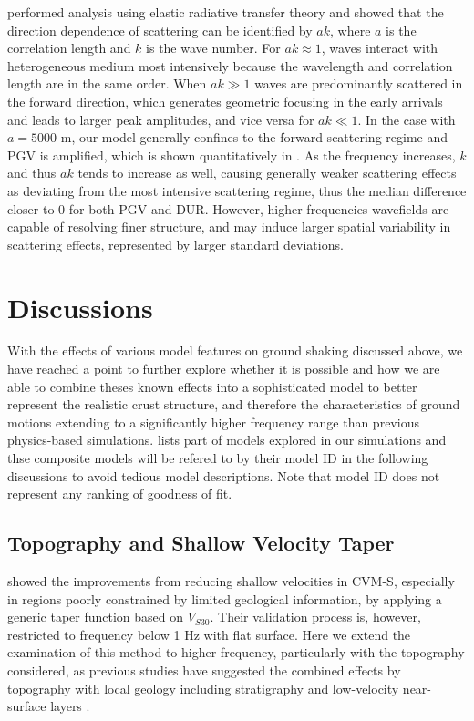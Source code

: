 \citet{przybillaEstimationCrustalScattering2009} performed analysis using elastic radiative transfer theory and showed that the direction dependence of scattering can be identified by $ak$, where $a$ is the correlation length and $k$ is the wave number. For $ak \approx 1$, waves interact with heterogeneous medium most intensively because the wavelength and correlation length are in the same order. When $ak\gg 1$ waves are predominantly scattered in the forward direction, which generates geometric focusing in the early arrivals and leads to larger peak amplitudes, and vice versa for $ak \ll 1$. In the case with $a=5000$ m, our model generally confines to the forward scattering regime and PGV is amplified, which is shown quantitatively in . As the frequency increases, $k$ and thus $ak$ tends to increase as well, causing generally weaker scattering effects as deviating from the most intensive scattering regime, thus the median difference closer to 0 for both PGV and DUR. However, higher frequencies wavefields are capable of resolving finer structure, and may induce larger spatial variability in scattering effects, represented by larger standard deviations.


\section{Discussions}
With the effects of various model features on ground shaking discussed above, we have reached a point to further explore whether it is possible and how we are able to combine theses known effects into a sophisticated model to better represent the realistic crust structure, and therefore the characteristics of ground motions extending to a significantly higher frequency range than previous physics-based simulations.  lists part of models explored in our simulations and thse composite models will be refered to by their model ID in the following discussions to avoid tedious model descriptions. Note that model ID does not represent any ranking of goodness of fit.

\subsection{Topography and Shallow Velocity Taper}\label{highf:topoandtaper}
\citet{huCalibrationNearsurfaceSeismic2021} showed the improvements from reducing shallow velocities in CVM-S, especially in regions poorly constrained by limited geological information, by applying a generic taper function based on $V_{S30}$.
Their validation process is, however, restricted to frequency below 1 Hz with flat surface. Here we extend the examination of this method to higher frequency, particularly with the topography considered, as previous studies have suggested the combined effects by topography with local geology including stratigraphy and low-velocity near-surface layers \citep{lebrun1999experimental,rovelli2002can}.

